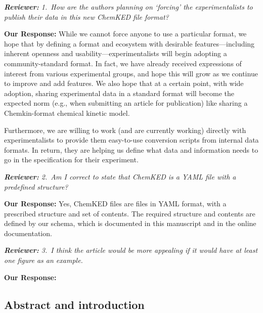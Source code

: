 \documentclass[a4paper,10pt]{elsarticle}
\newenvironment{reviewer}{\vspace{0.5\baselineskip}\begingroup\itshape\textbf{Reviewer:}}{\endgroup\vspace{0.5\baselineskip}}
\newenvironment{response}{\vspace{0.5\baselineskip}\textbf{Our Response:}}{\vspace{0.5\baselineskip}}
\begin{document}
\begin{reviewer}
    1.~How are the authors planning on `forcing' the experimentalists to publish their data in this
    new ChemKED file format?
\end{reviewer}

\begin{response}
    While we cannot force anyone to use a particular format, we hope that by defining a format and
    ecosystem with desirable features---including inherent openness and usability---experimentalists
    will begin adopting a community-standard format. In fact, we have already received expressions
    of interest from various experimental groups, and hope this will grow as we continue to improve
    and add features. We also hope that at a certain point, with wide adoption, sharing experimental
    data in a standard format will become the expected norm (e.g., when submitting an article for
    publication) like sharing a Chemkin-format chemical kinetic model.

    Furthermore, we are willing to work (and are currently working) directly with experimentalists
    to provide them easy-to-use conversion scripts from internal data formats. In return, they are
    helping us define what data and information needs to go in the specification for their
    experiment.
\end{response}

\begin{reviewer}
    2.~Am I correct to state that ChemKED is a YAML file with a predefined structure?
\end{reviewer}

\begin{response}
    Yes, ChemKED files are files in YAML format, with a prescribed structure and set of contents.
    The required structure and contents are defined by our schema, which is documented in this
    manuscript and in the online documentation.
\end{response}

\begin{reviewer}
    3.~I think the article would be more appealing if it would have at least one figure as an
    example.
\end{reviewer}

\begin{response}

\end{response}

\subsection*{Abstract and introduction}
\end{document}
